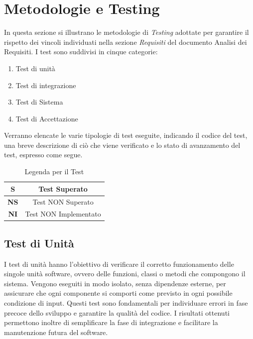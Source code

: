 \documentclass{article}
\begin{document}
\section{Metodologie e Testing}
In questa sezione si illustrano le metodologie di \textit{Testing} adottate per garantire il rispetto dei vincoli individuati
nella sezione \textit{Requisiti} del documento Analisi dei Requisiti. I test sono suddivisi in cinque categorie:
\begin{enumerate}
    \item Test di unità
    \item Test di integrazione
    \item Test di Sistema
    \item Test di Accettazione
\end{enumerate}
Verranno elencate le varie tipologie di test eseguite, indicando il codice del test, una breve descrizione di ciò che viene verificato e lo stato di avanzamento del test, espresso come segue.

\begin{table}[H]
    \centering
    \renewcommand{\arraystretch}{1.5}
\begin{tabular}{|c|c|}
    \hline
    \textbf{S} & Test Superato \\
    \hline
    \textbf{NS} & Test NON Superato \\
    \hline
    \textbf{NI} & Test NON Implementato \\
    \hline
\end{tabular}
\caption{Legenda per il Test}
\end{table}

\subsection{Test di Unità} %
I test di unità hanno l’obiettivo di verificare il corretto funzionamento delle singole unità software, ovvero delle funzioni, classi o metodi che compongono il sistema. Vengono eseguiti in modo isolato, senza dipendenze esterne, per assicurare che ogni componente si comporti come previsto in ogni possibile condizione di input.  
Questi test sono fondamentali per individuare errori in fase precoce dello sviluppo e garantire la qualità del codice. I risultati ottenuti permettono inoltre di semplificare la fase di integrazione e facilitare la manutenzione futura del software.

\renewcommand{\arraystretch}{1.5}  %
\end{document}
